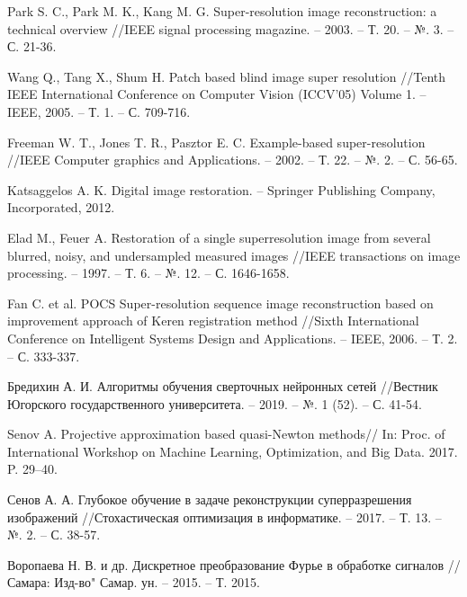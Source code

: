 \renewcommand\bibname{СПИСОК ИСПОЛЬЗОВАННЫХ ИСТОЧНИКОВ}
\begin{thebibliography}{3}
    \makeatletter
    \def\@biblabel#1{#1. }
    
    Park S. C., Park M. K., Kang M. G. Super-resolution image reconstruction: a technical overview //IEEE signal processing magazine. – 2003. – Т. 20. – №. 3. – С. 21-36.

    Wang Q., Tang X., Shum H. Patch based blind image super resolution //Tenth IEEE International Conference on Computer Vision (ICCV'05) Volume 1. – IEEE, 2005. – Т. 1. – С. 709-716.

    Freeman W. T., Jones T. R., Pasztor E. C. Example-based super-resolution //IEEE Computer graphics and Applications. – 2002. – Т. 22. – №. 2. – С. 56-65.

    Katsaggelos A. K. Digital image restoration. – Springer Publishing Company, Incorporated, 2012.

    Elad M., Feuer A. Restoration of a single superresolution image from several blurred, noisy, and undersampled measured images //IEEE transactions on image processing. – 1997. – Т. 6. – №. 12. – С. 1646-1658.

    Fan C. et al. POCS Super-resolution sequence image reconstruction based on improvement approach of Keren registration method //Sixth International Conference on Intelligent Systems Design and Applications. – IEEE, 2006. – Т. 2. – С. 333-337.
    
    Бредихин А. И. Алгоритмы обучения сверточных нейронных сетей //Вестник Югорского государственного университета. – 2019. – №. 1 (52). – С. 41-54.

    Senov A. Projective approximation based quasi-Newton methods// In: Proc. of International Workshop on Machine Learning, Optimization, and Big Data. 2017. P. 29–40.

    Сенов А. А. Глубокое обучение в задаче реконструкции суперразрешения изображений //Стохастическая оптимизация в информатике. – 2017. – Т. 13. – №. 2. – С. 38-57.

    Воропаева Н. В. и др. Дискретное преобразование Фурье в обработке сигналов //Самара: Изд-во" Самар. ун. – 2015. – Т. 2015.


\end{thebibliography}

